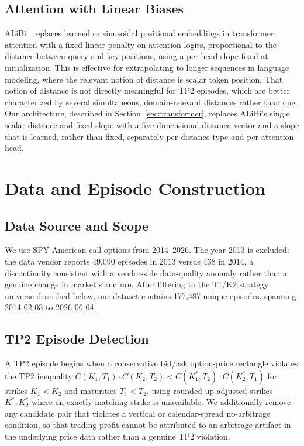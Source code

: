 \documentclass[sigconf,review,anonymous]{acmart}
\begin{document}
\subsection{Attention with Linear Biases}
ALiBi~\cite{press2022alibi} replaces learned or sinusoidal positional embeddings in transformer attention with a fixed linear penalty on attention logits, proportional to the distance between query and key positions, using a per-head slope fixed at initialization. This is effective for extrapolating to longer sequences in language modeling, where the relevant notion of distance is scalar token position. That notion of distance is not directly meaningful for TP2 episodes, which are better characterized by several simultaneous, domain-relevant distances rather than one. Our architecture, described in Section~\ref{sec:transformer}, replaces ALiBi's single scalar distance and fixed slope with a five-dimensional distance vector and a slope that is learned, rather than fixed, separately per distance type and per attention head.

\section{Data and Episode Construction}
\label{sec:data}

\subsection{Data Source and Scope}
\label{sec:data-source}
We use SPY American call options from 2014--2026. The year 2013 is excluded: the data vendor reports 49{,}090 episodes in 2013 versus 438 in 2014, a discontinuity consistent with a vendor-side data-quality anomaly rather than a genuine change in market structure. After filtering to the T1/K2 strategy universe described below, our dataset contains 177{,}487 unique episodes, spanning 2014-02-03 to 2026-06-04.

\subsection{TP2 Episode Detection}
A TP2 episode begins when a conservative bid/ask option-price rectangle violates the TP2 inequality $C(K_1,T_1)\cdot C(K_2,T_2) < C(K_1^{\ast},T_2)\cdot C(K_2^{\ast},T_1)$ for strikes $K_1 < K_2$ and maturities $T_1 < T_2$, using rounded-up adjusted strikes $K_1^{\ast}, K_2^{\ast}$ where an exactly matching strike is unavailable. We additionally remove any candidate pair that violates a vertical or calendar-spread no-arbitrage condition, so that trading profit cannot be attributed to an arbitrage artifact in the underlying price data rather than a genuine TP2 violation.
\end{document}
